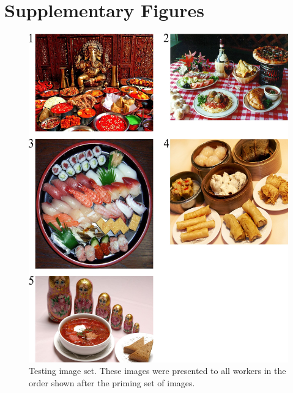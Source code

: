 \documentclass[letterpaper]{article}
\begin{document}
\section*{Supplementary Figures}

\begin{figure}
	\includegraphics[scale=1.00]{figs/taskImages/testImages.jpg}
	\caption{Testing image set. These images were presented to all workers in 
		the order shown after the priming set of images.}
\end{figure}
\end{document}
